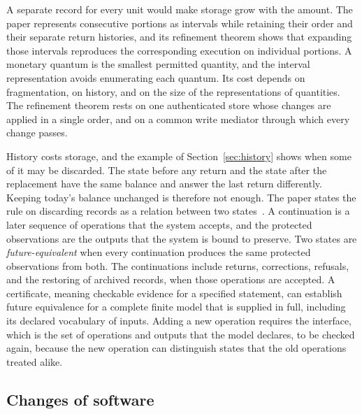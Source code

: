 \documentclass{momentum}
\begin{document}
A separate record for every unit would make storage grow with the amount. The paper represents consecutive portions as intervals while retaining their order and their separate return histories, and its refinement theorem shows that expanding those intervals reproduces the corresponding execution on individual portions. A monetary quantum is the smallest permitted quantity, and the interval representation avoids enumerating each quantum. Its cost depends on fragmentation, on history, and on the size of the representations of quantities. The refinement theorem rests on one authenticated store whose changes are applied in a single order, and on a common write mediator through which every change passes.

History costs storage, and the example of Section~\ref{sec:history} shows when some of it may be discarded. The state before any return and the state after the replacement have the same balance and answer the last return differently. Keeping today's balance unchanged is therefore not enough. The paper states the rule on discarding records as a relation between two states~\cite[Section~6.3]{aot}. A continuation is a later sequence of operations that the system accepts, and the protected observations are the outputs that the system is bound to preserve. Two states are \emph{future-equivalent} when every continuation produces the same protected observations from both. The continuations include returns, corrections, refusals, and the restoring of archived records, when those operations are accepted. A certificate, meaning checkable evidence for a specified statement, can establish future equivalence for a complete finite model that is supplied in full, including its declared vocabulary of inputs. Adding a new operation requires the interface, which is the set of operations and outputs that the model declares, to be checked again, because the new operation can distinguish states that the old operations treated alike.

\subsection{Changes of software}
\label{sec:conditions-program}
\end{document}

